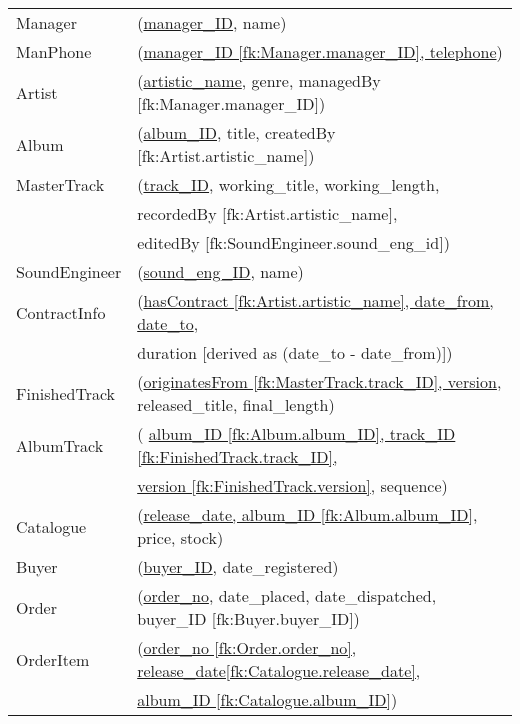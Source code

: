 \documentclass[11pt,a4paper]{article}
\begin{document}
\begin{table}[h]
 

\begin{tabular}{ll}
Manager    & (\underline{manager\_ID}, name) \\

ManPhone & (\underline{manager\_ID [fk:Manager.manager\_ID], telephone}) \\

Artist	    & 	 (\underline{artistic\_name}, genre, managedBy [fk:Manager.manager\_ID]) \\


Album	 	&  (\underline{album\_ID}, title, createdBy [fk:Artist.artistic\_name])\\

MasterTrack & (\underline{track\_ID}, working\_title, working\_length, \\
&	 	 recordedBy [fk:Artist.artistic\_name], \\
&	 	 editedBy [fk:SoundEngineer.sound\_eng\_id])\\

SoundEngineer &  (\underline{sound\_eng\_ID}, name)\\

ContractInfo &  (\underline{hasContract [fk:Artist.artistic\_name], date\_from, date\_to},\\
& duration [derived as (date\_to - date\_from)])\\

FinishedTrack & (\underline{originatesFrom [fk:MasterTrack.track\_ID], version}, released\_title, final\_length)\\

AlbumTrack & ( \underline{album\_ID [fk:Album.album\_ID], track\_ID [fk:FinishedTrack.track\_ID],}\\
           &  \underline{ version [fk:FinishedTrack.version]}, sequence)\\

Catalogue & (\underline{release\_date, album\_ID [fk:Album.album\_ID]}, price, stock)\\

Buyer & (\underline{buyer\_ID}, date\_registered)\\

Order & (\underline{order\_no}, date\_placed, date\_dispatched, buyer\_ID [fk:Buyer.buyer\_ID])\\

OrderItem & (\underline{order\_no [fk:Order.order\_no], release\_date[fk:Catalogue.release\_date], }\\
&  \underline{album\_ID [fk:Catalogue.album\_ID]})\\


\end{tabular}
\end{table}
\end{document}
